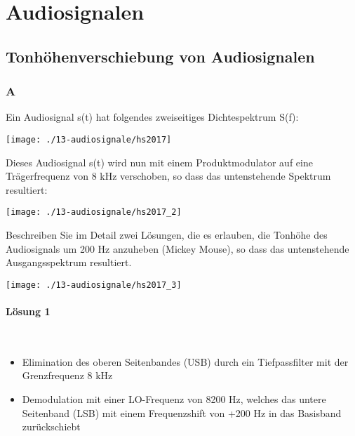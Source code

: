 

\section{Audiosignalen}

\subsection{Tonhöhenverschiebung von Audiosignalen}
\subsubsection{A}
Ein Audiosignal s(t) hat folgendes zweiseitiges Dichtespektrum S(f):

\begin{center}
    \vspace{-8pt}
    \texttt{[image: ./13-audiosignale/hs2017]}
    \vspace{-8pt}
\end{center}

Dieses Audiosignal s(t) wird nun mit einem Produktmodulator auf eine Trägerfrequenz von 8 kHz verschoben, so dass das untenstehende Spektrum resultiert:
\begin{center}
    \vspace{-8pt}
    \texttt{[image: ./13-audiosignale/hs2017\_2]}
    \vspace{-8pt}
\end{center}

Beschreiben Sie im Detail zwei Lösungen, die es erlauben, die Tonhöhe des Audiosignals um 200 Hz anzuheben (Mickey Mouse), so dass das untenstehende Ausgangsspektrum resultiert.
\begin{center}
    \vspace{-8pt}
    \texttt{[image: ./13-audiosignale/hs2017\_3]}
    \vspace{-8pt}
\end{center}

\paragraph{Lösung 1}\mbox{}\\
\begin{itemize}
    \item Elimination des oberen Seitenbandes (USB) durch ein Tiefpassfilter mit der Grenzfrequenz 8 kHz
    \item Demodulation mit einer LO-Frequenz von 8200 Hz, welches das untere Seitenband (LSB) mit einem Frequenzshift von +200 Hz in das Basisband zurückschiebt
\end{itemize}

